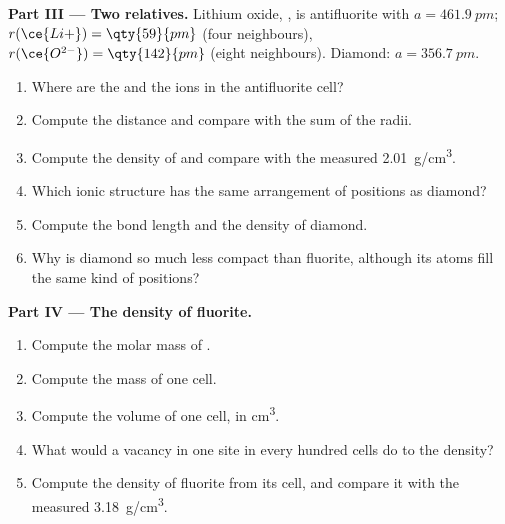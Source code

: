 \begin{problem}
\medskip
\noindent\textbf{Part III --- Two relatives.}
Lithium oxide, , is antifluorite with $a = \qty{461.9}{pm}$;
$r(\ce{Li+}) = \qty{59}{pm}$ (four neighbours), $r(\ce{O^{2-}}) =
\qty{142}{pm}$ (eight neighbours). Diamond: $a = \qty{356.7}{pm}$.
\begin{enumerate}[resume]
  \item Where are the  and the  ions in the antifluorite
        cell?
  \item Compute the  distance and compare with the sum of the
        radii.
  \item Compute the density of  and compare with the measured
        \qty{2.01}{g/cm^3}.
  \item Which ionic structure has the same arrangement of positions as
        diamond?
  \item Compute the  bond length and the density of diamond.
  \item Why is diamond so much less compact than fluorite, although its
        atoms fill the same kind of positions?
\end{enumerate}

\medskip
\noindent\textbf{Part IV --- The density of fluorite.}
\begin{enumerate}[resume]
  \item Compute the molar mass of .
  \item Compute the mass of one cell.
  \item Compute the volume of one cell, in \unit{cm^3}.
  \item What would a vacancy in one  site in every hundred cells do
        to the density?
  \item Compute the density of fluorite from its cell, and compare it with
        the measured \qty{3.18}{g/cm^3}.
\end{enumerate}
\end{problem}
